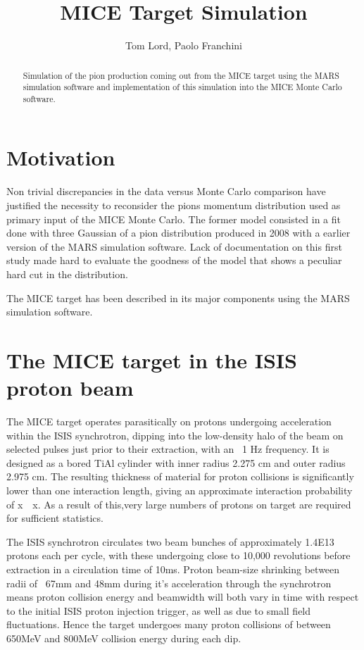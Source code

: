 \documentclass[a4paper,11pt]{article}
\title{MICE Target Simulation}
\author{Tom Lord, Paolo Franchini}
\begin{document}
\maketitle
\tableofcontents

\begin{abstract}
Simulation of the pion production coming out from the MICE target using the MARS simulation software and implementation of this simulation into the MICE Monte Carlo software.
\end{abstract}

\newpage

\section{Motivation}

Non trivial discrepancies in the data versus Monte Carlo comparison have justified the necessity to reconsider the pions momentum distribution used as primary input of the MICE Monte Carlo.
The former model consisted in a fit done with three Gaussian of a pion distribution produced in 2008 with a earlier version of the MARS simulation software. Lack of documentation on this first study made hard to evaluate the goodness of the model that shows a peculiar hard cut in the distribution.

The MICE target has been described in its major components using the MARS simulation software.
\section{The MICE target in the ISIS proton beam}

The MICE target operates parasitically on protons undergoing acceleration within the ISIS synchrotron, dipping into the low-density halo of the beam on selected pulses just prior to their extraction, with an ~1 Hz frequency. It is designed as a bored TiAl cylinder with inner radius 2.275 cm and outer radius 2.975 cm. The resulting thickness of material for proton collisions is significantly lower than one interaction length, giving an approximate interaction probability of x~~x. As a result of this,very large numbers of protons on target are required for sufficient statistics. 

The ISIS synchrotron circulates two beam bunches of approximately 1.4E13 protons each per cycle, with these undergoing close to 10,000 revolutions before extraction in a circulation time of 10ms. Proton beam-size shrinking between radii of ~67mm and 48mm during it's acceleration through the synchrotron means proton collision energy and beamwidth will both vary in time with respect to the initial ISIS proton injection trigger, as well as due to small field fluctuations. Hence the target undergoes many proton collisions of between 650MeV and 800MeV collision energy during each dip. 
\end{document}
